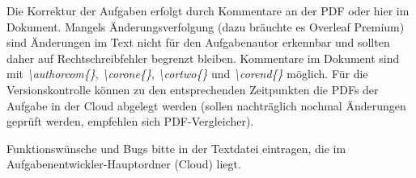 \documentclass[./main.tex]{subfiles}
\begin{document}
\bigskip
Die Korrektur der Aufgaben erfolgt durch Kommentare an der PDF oder hier im Dokument. Mangels \"Anderungsverfolgung (dazu br\"auchte es Overleaf Premium) sind \"Anderungen im Text nicht f\"ur den Aufgabenautor erkennbar und sollten daher auf Rechtschreibfehler begrenzt bleiben. Kommentare im Dokument sind mit \textit{\textbackslash authorcom\{\}}, \textit{\textbackslash corone\{\}}, \textit{\textbackslash cortwo\{\}} und \textit{\textbackslash corend\{\}} m\"oglich. F\"ur die Versionskontrolle k\"onnen zu den entsprechenden Zeitpunkten die PDFs der Aufgabe in der Cloud abgelegt werden (sollen nachtr\"aglich nochmal \"Anderungen gepr\"uft werden, empfehlen sich PDF-Vergleicher). 

\bigskip
Funktionsw\"unsche und Bugs bitte in der Textdatei eintragen, die im Aufgabenentwickler-Hauptordner (Cloud) liegt. 
\end{document}
